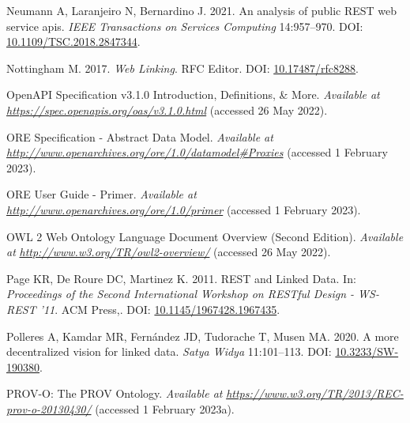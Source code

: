 \begin{CSLReferences}{1}{0}
\leavevmode{}%
Neumann A, Laranjeiro N, Bernardino J. 2021. An analysis of public REST web service apis. \emph{IEEE Transactions on Services Computing} 14:957--970. DOI: \href{https://doi.org/10.1109/TSC.2018.2847344}{10.1109/TSC.2018.2847344}.

\leavevmode{}%
Nottingham M. 2017. \emph{Web Linking}. RFC Editor. DOI: \href{https://doi.org/10.17487/rfc8288}{10.17487/rfc8288}.

\leavevmode{}%
OpenAPI Specification v3.1.0 \textbar{} Introduction, Definitions, \& More. \emph{Available at} \href{https://spec.openapis.org/oas/v3.1.0.html}{\emph{https://spec.openapis.org/oas/v3.1.0.html}} (accessed 26 May 2022).

\leavevmode{}%
ORE Specification - Abstract Data Model. \emph{Available at} \href{http://www.openarchives.org/ore/1.0/datamodel\#Proxies}{\emph{http://www.openarchives.org/ore/1.0/datamodel\#Proxies}} (accessed 1 February 2023).

\leavevmode{}%
ORE User Guide - Primer. \emph{Available at} \href{http://www.openarchives.org/ore/1.0/primer}{\emph{http://www.openarchives.org/ore/1.0/primer}} (accessed 1 February 2023).

\leavevmode{}%
OWL 2 Web Ontology Language Document Overview (Second Edition). \emph{Available at} \href{http://www.w3.org/TR/owl2-overview/}{\emph{http://www.w3.org/TR/owl2-overview/}} (accessed 26 May 2022).

\leavevmode{}%
Page KR, De Roure DC, Martinez K. 2011. REST and Linked Data. In: \emph{Proceedings of the Second International Workshop on RESTful Design - WS-REST '11}. ACM Press,. DOI: \href{https://doi.org/10.1145/1967428.1967435}{10.1145/1967428.1967435}.

\leavevmode{}%
Polleres A, Kamdar MR, Fernández JD, Tudorache T, Musen MA. 2020. A more decentralized vision for linked data. \emph{Satya Widya} 11:101--113. DOI: \href{https://doi.org/10.3233/SW-190380}{10.3233/SW-190380}.

\leavevmode{}%
PROV-O: The PROV Ontology. \emph{Available at} \href{https://www.w3.org/TR/2013/REC-prov-o-20130430/}{\emph{https://www.w3.org/TR/2013/REC-prov-o-20130430/}} (accessed 1 February 2023a).


\end{CSLReferences}

